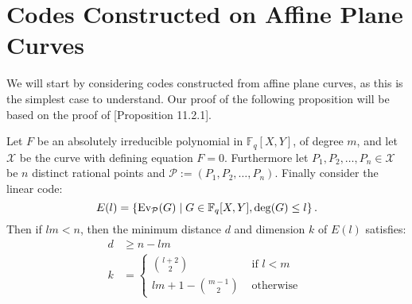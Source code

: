 \section{Codes Constructed on Affine Plane Curves}
We will start by considering codes constructed from affine plane curves, as this is the simplest case to understand. Our proof of the following proposition will be based on the proof of \cite{CCC_with_CA}[Proposition 11.2.1].
\begin{proposition}\label{prop:plane_code}
  Let $F$ be an absolutely irreducible polynomial in $\mathbb{F}_{q}[X, Y]$, of degree $m$, and let $\mathcal{X}$ be the curve with defining equation $F = 0$. Furthermore let $P_1, P_2, \ldots, P_{n} \in \mathcal{X}$ be $n$ distinct rational points and $\mathcal{P} := (P_1, P_2, \ldots, P_{n})$. Finally consider the linear code:
  \begin{equation*}
    E(l) = \left\{\textnormal{Ev}_\mathcal{P}(G) \mid G \in \mathbb{F}_{q}[X, Y], \deg(G) \leq l\right\}.
  \end{equation*}
  Then if $lm < n$, then the minimum distance $d$ and dimension $k$ of $E(l)$ satisfies:
  \begin{align*}
    d &\geq n  - lm \\
    k &= \begin{cases} \binom{l + 2}{2} & \text{ if } l < m \\
                      lm  + 1 - \binom{m - 1}{2} & \text{ otherwise }
        \end{cases}
  \end{align*}
\end{proposition}
